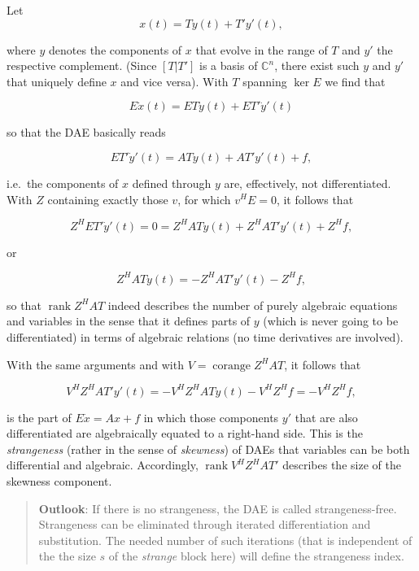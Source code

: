 \documentclass[]{book}
\theoremstyle{definition}
\theoremstyle{definition}
\theoremstyle{definition}
\theoremstyle{definition}
\theoremstyle{remark}
\begin{document}
Let
\[x(t) = Ty(t) + T'y'(t),\]

where \(y\) denotes the components of \(x\) that evolve in the range of \(T\) and \(y'\) the respective complement. (Since \([T|T']\) is a basis of \(\mathbb C^{n}\), there exist such \(y\) and \(y'\) that uniquely define \(x\) and vice versa). With \(T\) spanning \(\ker E\) we find that

\[E \dot x(t) = ET\dot y(t) + ET'\dot y'(t)\]

so that the DAE basically reads

\[ET'\dot y'(t) = ATy(t) + AT'y'(t)+f,\]

i.e.~the components of \(x\) defined through \(y\) are, effectively, not differentiated. With \(Z\) containing exactly those \(v\), for which \(v^HE=0\), it follows that

\[Z^HET'\dot y'(t) = 0 = Z^HATy(t) + Z^HAT'y'(t)+Z^Hf,\]

or

\[Z^HATy(t) = -Z^HAT'y'(t)-Z^Hf,\]

so that \(\operatorname{rank}Z^HAT\) indeed describes the number of purely algebraic equations and variables in the sense that it defines parts of \(y\) (which is never going to be differentiated) in terms of algebraic relations (no time derivatives are involved).

With the same arguments and with \(V=\operatorname{corange}Z^HAT\), it follows that

\[V^HZ^HAT'y'(t) = -V^HZ^HATy(t) -V^HZ^Hf=-V^HZ^Hf,\]

is the part of \(E\dot x = Ax + f\) in which those components \(y'\) that are also differentiated are algebraically equated to a right-hand side. This is the \emph{strangeness} (rather in the sense of \emph{skewness}) of DAEs that variables can be both differential and algebraic. Accordingly, \(\operatorname{rank}V^HZ^HAT'\) describes the size of the skewness component.

\begin{quote}
\textbf{Outlook}: If there is no strangeness, the DAE is called strangeness-free. Strangeness can be eliminated through iterated differentiation and substitution. The needed number of such iterations (that is independent of the the size \(s\) of the \emph{strange} block here) will define the strangeness index.
\end{quote}
\end{document}
